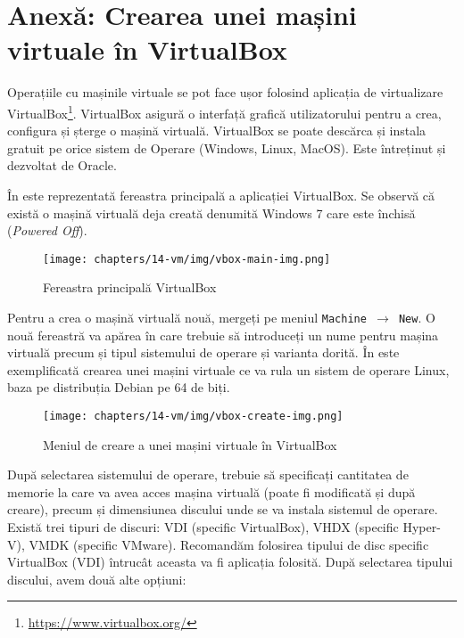 \section{Anexă: Crearea unei mașini virtuale în VirtualBox}
\label{sec:vm:create-vbox}

Operațiile cu mașinile virtuale se pot face ușor folosind aplicația de
virtualizare VirtualBox\footnote{\url{https://www.virtualbox.org/}}. VirtualBox asigură o interfață grafică utilizatorului
pentru a crea, configura și șterge o mașină virtuală. VirtualBox se poate descărca și instala gratuit pe orice sistem de Operare
(Windows, Linux, MacOS). Este întreținut și dezvoltat de Oracle.

În  este reprezentată fereastra
principală a aplicației VirtualBox. Se observă că există o mașină virtuală deja
creată denumită Windows 7 care este închisă (\textit{Powered Off}).

\begin{figure}[!htbp]
	\centering
	\texttt{[image: chapters/14-vm/img/vbox-main-img.png]}
	\caption{Fereastra principală VirtualBox}
	\label{fig:vm:vbox-main}
\end{figure}

Pentru a crea o mașină virtuală nouă, mergeți pe meniul \texttt{Machine $\rightarrow$ New}. O nouă
fereastră va apărea în care trebuie să introduceți un nume pentru mașina
virtuală precum și tipul sistemului de operare și varianta dorită. În
 este exemplificată crearea unei
mașini virtuale ce va rula un sistem de operare Linux, baza pe distribuția
Debian pe 64 de biți.

\begin{figure}[!htbp]
	\centering
	\texttt{[image: chapters/14-vm/img/vbox-create-img.png]}
	\caption{Meniul de creare a unei mașini virtuale în VirtualBox}
	\label{fig:vm:vbox-create}
\end{figure}

După selectarea sistemului de operare, trebuie să specificați cantitatea de
memorie la care va avea acces mașina virtuală (poate fi modificată și după
creare), precum și dimensiunea discului unde se va instala sistemul de operare.
Există trei tipuri de discuri: VDI (specific VirtualBox), VHDX (specific
Hyper-V), VMDK (specific VMware). Recomandăm folosirea tipului de disc specific
VirtualBox (VDI) întrucât aceasta va fi aplicația folosită. După selectarea
tipului discului, avem două alte opțiuni:

